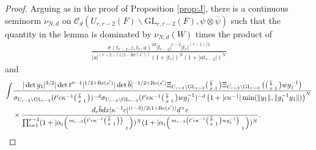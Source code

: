 \documentclass[12pt]{amsart}
\theoremstyle{remark}
\numberwithin{equation}{section}
\newcommand{\GL}{\mathrm{GL}}
\theoremstyle{definition}
\newenvironment{psmatrix}
  {\left(\begin{smallmatrix}}
  {\end{smallmatrix}\right)}
\numberwithin{equation}{subsection}
\newcommand{\norm}[1]{\lVert#1\rVert}
\begin{document}
\begin{proof}
Arguing as in the proof of Proposition \ref{prop:J}, there is a continuous seminorm $\nu_{N,d}$ on  $\mathcal{C}_{d}(U_{r,r-2}(F) \backslash \GL_{r,r-2}(F),\psi \otimes \overline{\psi})$ such that the quantity in the lemma is dominated by 
$
\nu_{N,d}\left(W \right)$ 
times
the product of 
\begin{align*}
\frac{\sigma(t_{r-2},z,t_r,a)^{2d}|t_{r-2}|^{r-2}|t_r|^{(r-1)/2}}{|a|^{(r-2)(1/2-\mathrm{Re}(s'))}(1+|t_r|)^{N}(1+|at_{r-2}|)^N}
\end{align*} 
and
\begin{align*}\int&\frac{|\det g_1|^{3/2}|\det t''^{-1}|^{1/2+\mathrm{Re}(s')}|\det \overline{b}|^{-1/2+\mathrm{Re}(s')}\Xi_{U_{r-3} \backslash \GL_{r-3}}\begin{psmatrix} \overline{b} & \\ x & 1 \end{psmatrix}\Xi_{U_{r-3} \backslash \GL_{r-3}}\left(\begin{psmatrix} \overline{b} & \\ x & 1\end{psmatrix}wg_1^{-1}\right)}{\sigma_{U_{r-3} \backslash \GL_{r-3}}(t'c\kappa^{-1}\begin{psmatrix} \overline{b} & \\ x & 1 \end{psmatrix})^{-d}\sigma_{U_{r-3} \backslash \GL_{r-3}}(t'c\kappa^{-1}\begin{psmatrix} \overline{b} & \\ x & 1 \end{psmatrix}wg_1^{-1})^{-d}\left(1+|c\kappa^{-1}|\min(\norm{y_1},\norm{g_1^{-1}y_1})\right)^{N}}\\& \times
  \frac{d_r\overline{b}dx |\kappa^{-1}c|^{(r-3)/2(1+\mathrm{Re}(s'))} d^\times c}{ \prod_{i=1}^{r-3}(1+|\alpha_i\begin{psmatrix} m_{r-3}\left(t'c\kappa^{-1}\begin{psmatrix} \overline{b} & \\ x & 1 \end{psmatrix}\right) & \\ & 1 \end{psmatrix})^{N}(1+|\alpha_i\begin{psmatrix} m_{r-3}\left(t'c\kappa^{-1}\begin{psmatrix} \overline{b} & \\ x & 1 \end{psmatrix}wg_1^{-1}\right) & \\ & 1 \end{psmatrix})^{N}}.

\end{align*}
\end{proof}
\end{document}

